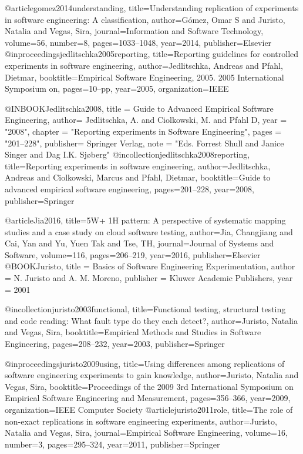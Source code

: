 @article{gomez2014understanding,
  title={Understanding replication of experiments in software engineering: A classification},
  author={G{\'o}mez, Omar S and Juristo, Natalia and Vegas, Sira},
  journal={Information and Software Technology},
  volume={56},
  number={8},
  pages={1033--1048},
  year={2014},
  publisher={Elsevier}
}
@inproceedings{jedlitschka2005reporting,
  title={Reporting guidelines for controlled experiments in software engineering},
  author={Jedlitschka, Andreas and Pfahl, Dietmar},
  booktitle={Empirical Software Engineering, 2005. 2005 International Symposium on},
  pages={10--pp},
  year={2005},
  organization={IEEE}
}

@INBOOK{Jedlitschka2008,
  title =        {Guide to Advanced Empirical Software Engineering},
  author=        {Jedlitschka, A. and Ciolkowski, M. and  Pfahl D},
  year =         "2008",
  chapter =      "Reporting experiments in Software Engineering",
  pages =        "201--228",
  publisher=    {Springer Verlag},
  note =         "Eds. Forrest Shull and Janice Singer and Dag I.K. Sjøberg"
}
@incollection{jedlitschka2008reporting,
  title={Reporting experiments in software engineering},
  author={Jedlitschka, Andreas and Ciolkowski, Marcus and Pfahl, Dietmar},
  booktitle={Guide to advanced empirical software engineering},
  pages={201--228},
  year={2008},
  publisher={Springer}
}

@article{Jia2016,
  title={5W+ 1H pattern: A perspective of systematic mapping studies and a case study on cloud software testing},
  author={Jia, Changjiang and Cai, Yan and Yu, Yuen Tak and Tse, TH},
  journal={Journal of Systems and Software},
  volume={116},
  pages={206--219},
  year={2016},
  publisher={Elsevier}
}
@BOOK{Juristo,
title     = {{Basics of Software Engineering Experimentation}},
author    = {N. Juristo and A. M. Moreno},
publisher = {Kluwer Academic Publishers},
year      = {2001}
}

@incollection{juristo2003functional,
  title={Functional testing, structural testing and code reading: What fault type do they each detect?},
  author={Juristo, Natalia and Vegas, Sira},
  booktitle={Empirical Methods and Studies in Software Engineering},
  pages={208--232},
  year={2003},
  publisher={Springer}
}

@inproceedings{juristo2009using,
  title={Using differences among replications of software engineering experiments to gain knowledge},
  author={Juristo, Natalia and Vegas, Sira},
  booktitle={Proceedings of the 2009 3rd International Symposium on Empirical Software Engineering and Measurement},
  pages={356--366},
  year={2009},
  organization={IEEE Computer Society}
} 
@article{juristo2011role,
  title={The role of non-exact replications in software engineering experiments},
  author={Juristo, Natalia and Vegas, Sira},
  journal={Empirical Software Engineering},
  volume={16},
  number={3},
  pages={295--324},
  year={2011},
  publisher={Springer}
} 

